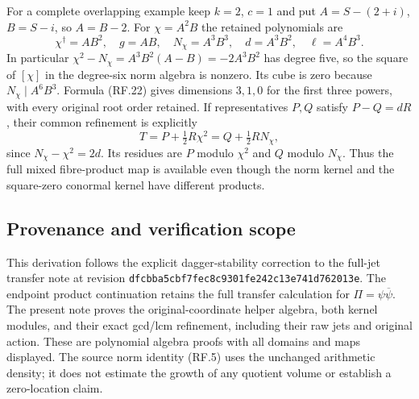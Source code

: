 For a complete overlapping example keep $k=2$, $c=1$ and
put $A=S-(2+i)$, $B=S-i$, so $A=B-2$. For
$\chi=A^2B$ the retained polynomials are
\[
 \chi^\dagger=AB^2,\quad g=AB,\quad
 N_\chi=A^3B^3,\quad d=A^3B^2,\quad\ell=A^4B^3.
 \tag{RF.25}
\]
In particular
$\chi^2-N_\chi=A^3B^2(A-B)=-2A^3B^2$ has degree five,
so the square of $[\chi]$ in the degree-six norm algebra is
nonzero. Its cube is zero because $N_\chi\mid A^6B^3$.
Formula (RF.22) gives dimensions $3,1,0$ for the first three
powers, with every original root order retained. If representatives
$P,Q$ satisfy $P-Q=dR$, their common refinement is explicitly
\[
 T=P+\tfrac12R\chi^2=Q+\tfrac12RN_\chi,
 \tag{RF.26}
\]
since $N_\chi-\chi^2=2d$. Its residues are $P$ modulo
$\chi^2$ and $Q$ modulo $N_\chi$. Thus the full mixed
fibre-product map is available even though the norm kernel and
the square-zero conormal kernel have different products.

\subsection{Provenance and verification scope}

This derivation follows the explicit dagger-stability correction
to the full-jet transfer note at revision
\texttt{dfcbba5cbf7fec8c9301fe242c13e741d762013e}.
The endpoint product continuation retains the full transfer
calculation for $\Pi=\psi\overline\psi$. The present note proves
the original-coordinate helper algebra, both kernel modules,
and their exact gcd/lcm refinement, including their raw jets and
original action. These are polynomial algebra proofs with all
domains and maps displayed. The source norm identity (RF.5)
uses the unchanged arithmetic density; it does not estimate the
growth of any quotient volume or establish a zero-location claim.

\endgroup
